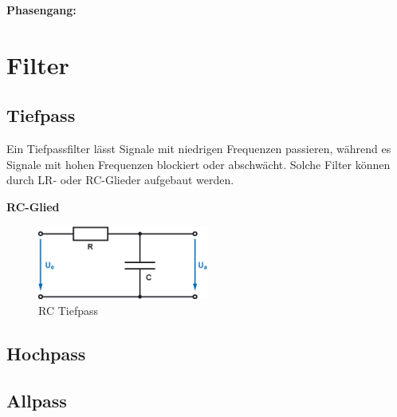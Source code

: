 \textbf{Phasengang:}
\begin{center}
\end{center}

\section{Filter}
\subsection{Tiefpass}
Ein Tiefpassfilter lässt Signale mit niedrigen Frequenzen passieren, während es
Signale mit hohen Frequenzen blockiert oder abschwächt. Solche Filter können
durch LR- oder RC-Glieder aufgebaut werden.

\textbf{RC-Glied}
\begin{figure}
    \centering
    \includegraphics[width=0.5\textwidth]{LineareBauteile/RC-Glied.png}
    \caption{RC Tiefpass}
\end{figure}

\subsection{Hochpass}
\subsection{Allpass}
